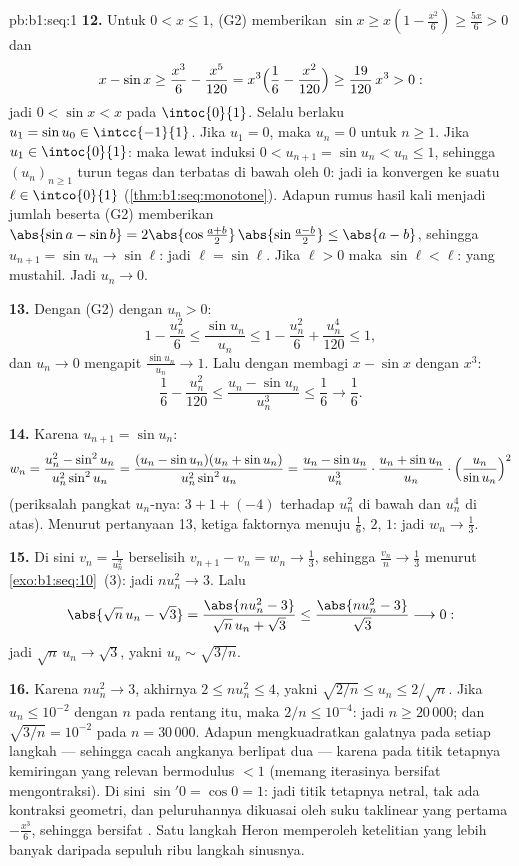 \begin{solution}{pb:b1:seq:1}
\textbf{12.} Untuk $0 < x \leq 1$, (G2) memberikan $\sin x \geq x(1 -
\frac{x^2}{6}) \geq \frac{5x}{6} > 0$ dan
\[
x - \sin x \geq \frac{x^3}{6} - \frac{x^5}{120}
= x^3\Bigl(\frac16 - \frac{x^2}{120}\Bigr)
\geq \frac{19}{120}\,x^3 > 0 :
\]
jadi $0 < \sin x < x$ pada $\intoc{0}{1}$. Selalu berlaku $u_1 = \sin u_0
\in \intcc{-1}{1}$. Jika $u_1 = 0$, maka $u_n = 0$ untuk $n \geq 1$.
Jika $u_1 \in \intoc{0}{1}$: maka lewat induksi $0 < u_{n+1} = \sin u_n
< u_n \leq 1$, sehingga $(u_n)_{n\geq1}$ turun tegas dan
terbatas di bawah oleh $0$: jadi ia konvergen ke suatu $\ell \in
\intco{0}{1}$ (\cref{thm:b1:seq:monotone}). Adapun rumus hasil kali menjadi
jumlah beserta (G2) memberikan $\abs{\sin a - \sin b} = 2\abs{\cos
\frac{a+b}{2}}\,\abs{\sin\frac{a-b}{2}} \leq \abs{a - b}$, sehingga
$u_{n+1} = \sin u_n \to \sin \ell$: jadi $\ell = \sin\ell$. Jika $\ell
> 0$ maka $\sin\ell < \ell$: yang mustahil. Jadi $u_n \to 0$.

\textbf{13.} Dengan  (G2) dengan $u_n > 0$:
\[
1 - \frac{u_n^2}{6} \leq \frac{\sin u_n}{u_n} \leq 1 -
\frac{u_n^2}{6} + \frac{u_n^4}{120} \leq 1 ,
\]
dan $u_n \to 0$ mengapit $\frac{\sin u_n}{u_n} \to 1$. Lalu dengan membagi
$x - \sin x$ dengan $x^3$:
\[
\frac16 - \frac{u_n^2}{120} \leq \frac{u_n - \sin u_n}{u_n^3}
\leq \frac16 \longrightarrow \frac16 .
\]

\textbf{14.} Karena $u_{n+1} = \sin u_n$:
\[
w_n = \frac{u_n^2 - \sin^2 u_n}{u_n^2 \sin^2 u_n}
= \frac{(u_n - \sin u_n)(u_n + \sin u_n)}{u_n^2 \sin^2 u_n}
= \frac{u_n - \sin u_n}{u_n^3}\cdot
\frac{u_n + \sin u_n}{u_n}\cdot
\Bigl(\frac{u_n}{\sin u_n}\Bigr)^{2}
\]
(periksalah pangkat $u_n$-nya: $3 + 1 + (-4)$ terhadap $u_n^2$
di bawah dan $u_n^4$ di atas). Menurut pertanyaan 13, ketiga
faktornya menuju $\frac16$, $2$, $1$: jadi $w_n \to \frac13$.

\textbf{15.} Di sini $v_n = \frac{1}{u_n^2}$ berselisih $v_{n+1} -
v_n = w_n \to \frac13$, sehingga $\frac{v_n}{n} \to \frac13$ menurut
\cref{exo:b1:seq:10}~(3): jadi $n u_n^2 \to 3$. Lalu
\[
\abs{\sqrt n\,u_n - \sqrt 3}
= \frac{\abs{n u_n^2 - 3}}{\sqrt n\,u_n + \sqrt 3}
\leq \frac{\abs{n u_n^2 - 3}}{\sqrt 3} \longrightarrow 0 :
\]
jadi $\sqrt n\,u_n \to \sqrt 3$, yakni $u_n \sim \sqrt{3/n}$.

\textbf{16.} Karena $n u_n^2 \to 3$, akhirnya $2 \leq n u_n^2
\leq 4$, yakni $\sqrt{2/n} \leq u_n \leq 2/\sqrt n$. Jika $u_n
\leq 10^{-2}$ dengan $n$ pada rentang itu, maka $2/n \leq 10^{-4}$:
jadi $n \geq 20\,000$; dan $\sqrt{3/n} = 10^{-2}$ pada $n = 30\,000$.
Adapun  mengkuadratkan galatnya pada setiap langkah --- sehingga cacah
angkanya berlipat dua --- karena pada titik tetapnya kemiringan yang relevan
bermodulus $< 1$ (memang iterasinya bersifat mengontraksi).
Di sini $\sin' 0 = \cos 0 = 1$: jadi titik tetapnya netral, tak ada
kontraksi geometri, dan peluruhannya dikuasai oleh
suku taklinear yang pertama $-\frac{x^3}{6}$, sehingga bersifat . Satu
langkah Heron memperoleh ketelitian yang lebih banyak daripada sepuluh ribu langkah
sinusnya.


\end{solution}
